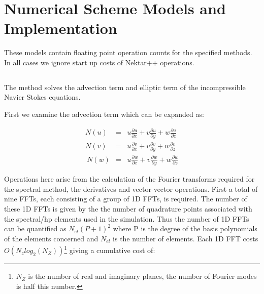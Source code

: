 
\chapter{Numerical Scheme Models and Implementation} %

\label{Chapter2} %

These models contain floating point operation counts for the specified methods. In all cases we ignore start up costs of Nektar++ operations. 


\section{}
The  method solves the advection term and elliptic term of the incompressible Navier Stokes equations. 

First we examine the advection term which can be expanded as:

\begin{eqnarray}
N(u) & = & u \frac{\partial u}{\partial x} + v \frac{\partial u}{\partial y} + w \frac{\partial u}{\partial z} \\
N(v) & = & u \frac{\partial v}{\partial x} + v \frac{\partial v}{\partial y} + w \frac{\partial v}{\partial z} \\\
N(w) & = & u \frac{\partial w}{\partial x} + v \frac{\partial w}{\partial y} + w \frac{\partial w}{\partial z}
\end{eqnarray}

Operations here arise from the calculation of the Fourier transforms required for the spectral method, the derivatives and vector-vector operations. First a total of nine FFTs, each consisting of a group of 1D FFTs, is required. The number of these 1D FFTs is given by the the number of quadrature points associated with the spectral/hp elements used in the simulation. Thus the number of 1D FFTs can be quantified as \(N_{el}(P+1)^2\) where P is the degree of the basis polynomials of the elements concerned and \(N_{el}\) is the number of elements. Each 1D FFT costs \(O(N_z log_2(N_Z))\)\footnote{\(N_Z\) is the number of real and imaginary planes, the number of Fourier modes is half this number.} giving a cumulative cost of:

